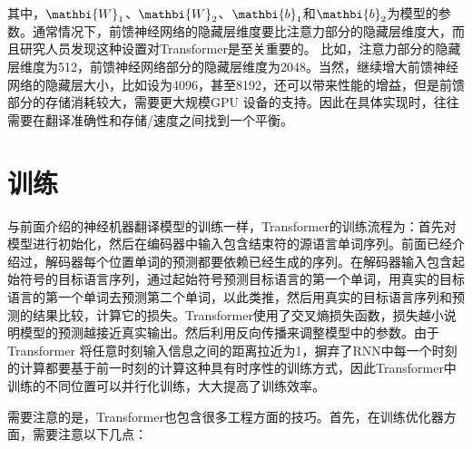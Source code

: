 \noindent 其中，$\mathbi{W}_1$、$\mathbi{W}_2$、$\mathbi{b}_1$和$\mathbi{b}_2$为模型的参数。通常情况下，前馈神经网络的隐藏层维度要比注意力部分的隐藏层维度大，而且研究人员发现这种设置对Transformer是至关重要的。 比如，注意力部分的隐藏层维度为512，前馈神经网络部分的隐藏层维度为2048。当然，继续增大前馈神经网络的隐藏层大小，比如设为4096，甚至8192，还可以带来性能的增益，但是前馈部分的存储消耗较大，需要更大规模GPU 设备的支持。因此在具体实现时，往往需要在翻译准确性和存储/速度之间找到一个平衡。


\section{训练}

\parinterval 与前面介绍的神经机器翻译模型的训练一样，Transformer的训练流程为：首先对模型进行初始化，然后在编码器中输入包含结束符的源语言单词序列。前面已经介绍过，解码器每个位置单词的预测都要依赖已经生成的序列。在解码器输入包含起始符号的目标语言序列，通过起始符号预测目标语言的第一个单词，用真实的目标语言的第一个单词去预测第二个单词，以此类推，然后用真实的目标语言序列和预测的结果比较，计算它的损失。Transformer使用了交叉熵损失函数，损失越小说明模型的预测越接近真实输出。然后利用反向传播来调整模型中的参数。由于Transformer 将任意时刻输入信息之间的距离拉近为1，摒弃了RNN中每一个时刻的计算都要基于前一时刻的计算这种具有时序性的训练方式，因此Transformer中训练的不同位置可以并行化训练，大大提高了训练效率。

%

\parinterval 需要注意的是，Transformer也包含很多工程方面的技巧。首先，在训练优化器方面，需要注意以下几点：

